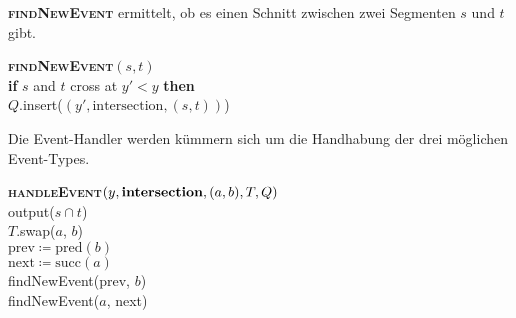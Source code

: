\begin{minipage}{.35\textwidth}
  \vspace*{1em}
  \textbf{\textsc{findNewEvent}} ermittelt, ob es einen Schnitt zwischen zwei Segmenten \( s \) und \( t \) gibt.
  \vspace*{1em}
\end{minipage}
\hfill
\begin{minipage}{.6\textwidth}
  \vspace*{1em}
  \begin{pseudocode}
    \textbf{\textsc{findNewEvent}}\( (s,t) \) \\
    \textbf{if} \( s \) and \( t \) cross at \( y' < y \) \textbf{then} \\
    \phantom{\enskip} \( Q \).insert(\( (y',\text{intersection},(s,t)) \))
  \end{pseudocode}
  \vspace*{1em}
\end{minipage}

\begin{minipage}{.36\textwidth}
  \vspace*{1em}
  Die Event-Handler werden kümmern sich um die Handhabung der drei möglichen Event-Types.
  \vspace*{1em}
\end{minipage}
\hfill
\begin{minipage}{.6\textwidth}
  \vspace*{1em}
  \begin{pseudocode}
    \textbf{\textsc{handleEvent}}\( (y, \text{\textbf{intersection}}, (a,b), T, Q) \) \\
    output(\( s \cap t \)) \\
    \( T \).swap(\( a \), \( b \)) \\
    \( \text{prev} \coloneqq \text{pred}(b) \) \\
    \( \text{next} \coloneqq \text{succ}(a) \) \\
    findNewEvent(prev, \( b \)) \\
    findNewEvent(\( a \), next)
  \end{pseudocode}
  \vspace*{1em}
\end{minipage}

